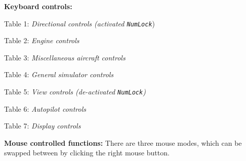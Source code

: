 \documentclass[10pt]{article}
\begin{document}
 \noindent
 \textbf{Keyboard controls:}
\begin{multicols}{2}
 \noindent
Table 1: \textit{Directional controls (activated \texttt{NumLock}})\\

\noindent

\bigskip

 \noindent
Table 2: \textit{Engine controls}
\medskip

 \noindent

\medskip

 \noindent
Table 3: \textit{Miscellaneous aircraft controls}
\medskip

 \noindent

\bigskip


 \noindent
Table 4: \textit{General simulator controls}
\medskip

 \noindent

\medskip

\noindent
Table 5: \textit{View controls (de-activated \texttt{NumLock})}
\medskip

 \noindent
 
\medskip


\medskip

 \noindent
 Table 6: \textit{Autopilot controls}
\medskip

\noindent

\medskip

 \noindent
 Table 7: \textit{Display controls}
\medskip

 \noindent

\bigskip

\end{multicols}

 \noindent
 \textbf{Mouse controlled functions:}
 There are three mouse modes, which can be swapped between by clicking the right mouse button.
\end{document}
